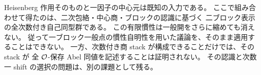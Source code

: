 \begin{remark}[認識問題への帰結]
\label{tba:rem:inertia-scope}
Heisenberg 作用そのものと一因子の中心元は既知の入力である。
ここで組み合わせて得たのは、二次包絡・中心商・ブロックの認識に基づく
二ブロック表示の全次数付き自己同型群である。
この有限慣性は一般開をさらに縮めても消えない。
従って一ブロック一般点の慣性自明性を用いた議論を、そのまま適用することはできない。
一方、次数付き商 stack が構成できることだけでは、その stack が
全 $\mathcal O$-保存 Abel 同値を記述することは証明されない。
その認識と次数一 shift の選択の問題は、別の課題として残る。
\end{remark}
